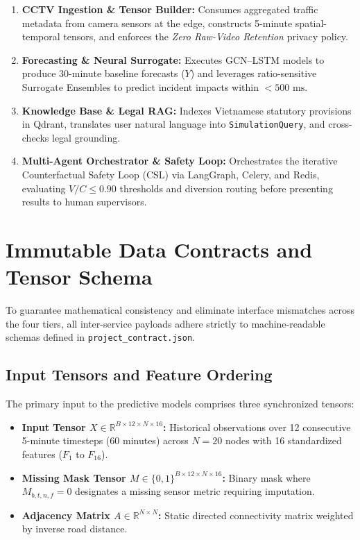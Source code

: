 \begin{enumerate}[leftmargin=1.5cm, label=\textbf{Tier \arabic*:}]
  \item \textbf{CCTV Ingestion \& Tensor Builder:} Consumes aggregated traffic metadata from camera sensors at the edge, constructs 5-minute spatial-temporal tensors, and enforces the \textit{Zero Raw-Video Retention} privacy policy.
  \item \textbf{Forecasting \& Neural Surrogate:} Executes GCN--LSTM models to produce 30-minute baseline forecasts ($Y$) and leverages ratio-sensitive Surrogate Ensembles to predict incident impacts within $< 500\text{ ms}$.
  \item \textbf{Knowledge Base \& Legal RAG:} Indexes Vietnamese statutory provisions in Qdrant, translates user natural language into \texttt{SimulationQuery}, and cross-checks legal grounding.
  \item \textbf{Multi-Agent Orchestrator \& Safety Loop:} Orchestrates the iterative Counterfactual Safety Loop (CSL) via LangGraph, Celery, and Redis, evaluating $V/C \le 0.90$ thresholds and diversion routing before presenting results to human supervisors.
\end{enumerate}

\section{Immutable Data Contracts and Tensor Schema}
To guarantee mathematical consistency and eliminate interface mismatches across the four tiers, all inter-service payloads adhere strictly to machine-readable schemas defined in \texttt{project\_contract.json}.

\subsection{Input Tensors and Feature Ordering}
The primary input to the predictive models comprises three synchronized tensors:
\begin{itemize}[leftmargin=1.5cm, label=$\bullet$]
  \item \textbf{Input Tensor $X \in \mathbb{R}^{B \times 12 \times N \times 16}$:} Historical observations over 12 consecutive 5-minute timesteps (60 minutes) across $N=20$ nodes with 16 standardized features ($F_1$ to $F_{16}$).
  \item \textbf{Missing Mask Tensor $M \in \{0, 1\}^{B \times 12 \times N \times 16}$:} Binary mask where $M_{b,t,n,f} = 0$ designates a missing sensor metric requiring imputation.
  \item \textbf{Adjacency Matrix $A \in \mathbb{R}^{N \times N}$:} Static directed connectivity matrix weighted by inverse road distance.
\end{itemize}

